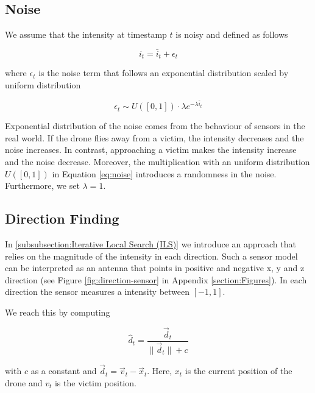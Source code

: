 \documentclass[conference]{IEEEtran}
\begin{document}
\subsection{Noise}

We assume that the intensity at timestamp $t$ is noisy and defined as follows

\begin{equation}
i_{t} = \bar{i}_{t} + \epsilon_{t}
\end{equation}

where $\epsilon_{t}$ is the noise term that follows an exponential distribution scaled by uniform distribution

\begin{equation}
\epsilon_{t} \sim U([0, 1]) \cdot \lambda e^{- \lambda \bar{i}_{t}}\label{eq:noise}
\end{equation}

 Exponential distribution of the noise comes from the behaviour of sensors in the real world. If the drone flies away from a victim, the intensity decreases and the noise increases. In contrast, approaching a victim makes the intensity increase and the noise decrease. Moreover, the multiplication with an uniform distribution $U([0, 1])$ in Equation \eqref{eq:noise} introduces a randomness in the noise. Furthermore, we set $\lambda = 1$.  


\subsection{Direction Finding}\label{subsection:Direction Finding}

In \ref{subsubsection:Iterative Local Search (ILS)} we introduce an approach that relies on the magnitude of the intensity in each direction. Such a sensor model can be interpreted as an antenna that points in positive and negative x, y and z direction (see Figure \ref{fig:direction-sensor} in Appendix \ref{section:Figures}). In each direction the sensor measures a intensity between $[-1, 1]$.

We reach this by computing

\begin{equation}
\hat{d}_{t} = \frac{\Vec{d}_{t}}{\lVert \Vec{d}_{t}\rVert + c}\label{eq:direction-sensor}
\end{equation}

with $c$ as a constant and $\Vec{d}_{t} = \Vec{v}_{t} - \Vec{x}_{t}$. Here, $x_{t}$ is the current position of the drone and $v_{t}$ is the victim position.
\end{document}
